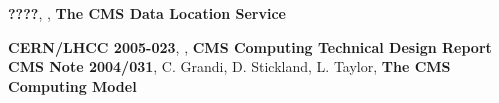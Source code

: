 \documentclass[pdftex]{cmspaper}
\begin{document}

\begin{thebibliography}{9}
   {\bf ????}, , {\bf The CMS Data Location Service} 
  
   {\bf CERN/LHCC 2005-023}, , {\bf CMS Computing Technical Design Report}
   {\bf CMS Note 2004/031}, C. Grandi, D. Stickland,
               L. Taylor, {\bf The CMS Computing Model}

\end{thebibliography}
 
\pagebreak
\end{document}
